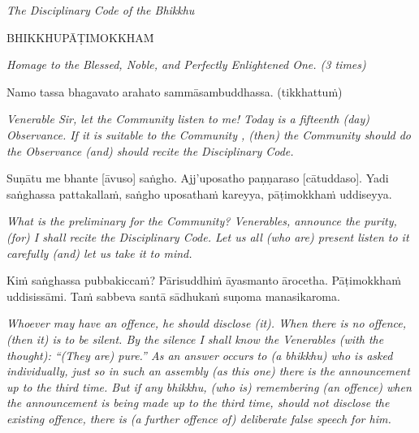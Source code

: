 \documentclass[11pt]{article}
\begin{document}
\begin{paracol}{2}
\begin{column}
{\itshape\footnotesize
The Disciplinary Code of the Bhikkhu
}
\switchcolumn

\begin{flushleft}
BHIKKHUPĀṬIMOKKHAṀ
\switchcolumn*
\end{flushleft}

{\itshape\footnotesize
Homage to the Blessed, Noble, and Perfectly Enlightened One.
(3 times)
}
\switchcolumn

\begin{flushleft}
Namo tassa bhagavato arahato sammāsambuddhassa.
(tikkhattuṁ)
\switchcolumn*
\end{flushleft}

{\itshape\footnotesize
Venerable Sir, let the Community listen to me! Today is a fifteenth (day) Observance. If it is suitable to the Community , (then) the Community should do the Observance (and) should recite the Disciplinary Code.
}
\switchcolumn

\begin{flushleft}
Suṇātu me bhante [āvuso] saṅgho. Ajj’uposatho paṇṇaraso [cātuddaso]. Yadi saṅghassa pattakallaṁ, saṅgho uposathaṁ kareyya, pāṭimokkhaṁ uddiseyya.
\switchcolumn*
\end{flushleft}

{\itshape\footnotesize
What is the preliminary for the Community? Venerables, announce the purity, (for) I shall recite the Disciplinary Code. Let us all (who are) present listen to it carefully (and) let us take it to mind.
}
\switchcolumn

\begin{flushleft}
Kiṁ saṅghassa pubbakiccaṁ? Pārisuddhiṁ āyasmanto ārocetha. Pāṭimokkhaṁ uddisissāmi. Taṁ sabbeva santā sādhukaṁ suṇoma manasikaroma.
\switchcolumn*
\end{flushleft}

{\itshape\footnotesize
Whoever may have an offence, he should disclose (it). When there is no offence, (then it) is to be silent. By the silence I shall know the Venerables (with the thought): “(They are) pure.” As an answer occurs to (a bhikkhu) who is asked individually, just so in such an assembly (as this one) there is the announcement up to the third time. But if any bhikkhu, (who is) remembering (an offence) when the announcement is being made up to the third time, should not disclose the existing offence, there is (a further offence of) deliberate false speech for him.
}
\switchcolumn


\end{column}
\end{paracol}
\end{document}
